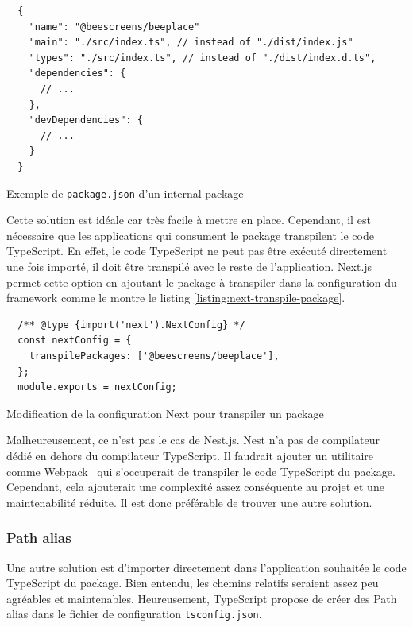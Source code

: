 \begin{listing}[H]
  \begin{verbatim}
  {
    "name": "@beescreens/beeplace"
    "main": "./src/index.ts", // instead of "./dist/index.js"
    "types": "./src/index.ts", // instead of "./dist/index.d.ts",
    "dependencies": {
      // ...
    },
    "devDependencies": {
      // ...
    }
  }
\end{verbatim}
  \caption{Exemple de \texttt{package.json} d'un internal package}
  \label{listing:internal-package-json}
\end{listing}

Cette solution est idéale car très facile à mettre en place. Cependant, il est nécessaire que les applications qui consument le package transpilent le code TypeScript. En effet, le code TypeScript ne peut pas être exécuté directement une fois importé, il doit être transpilé avec le reste de l'application. Next.js permet cette option en ajoutant le package à transpiler dans la configuration du framework comme le montre le listing \ref{listing:next-transpile-package}.

\begin{listing}[H]
  \begin{verbatim}
  /** @type {import('next').NextConfig} */
  const nextConfig = {
    transpilePackages: ['@beescreens/beeplace'],
  };
  module.exports = nextConfig;
\end{verbatim}
  \caption{Modification de la configuration Next pour transpiler un package}
  \label{listing:next-transpile-package}
\end{listing}

Malheureusement, ce n'est pas le cas de Nest.js. Nest n'a pas de compilateur dédié en dehors du compilateur TypeScript. Il faudrait ajouter un utilitaire comme Webpack~\cite{webpack} qui s'occuperait de transpiler le code TypeScript du package. Cependant, cela ajouterait une complexité assez conséquente au projet et une maintenabilité réduite. Il est donc préférable de trouver une autre solution.

\subsubsection{Path alias}

Une autre solution est d'importer directement dans l'application souhaitée le code TypeScript du package. Bien entendu, les chemins relatifs seraient assez peu agréables et maintenables. Heureusement, TypeScript propose de créer des Path alias dans le fichier de configuration \texttt{tsconfig.json}.

